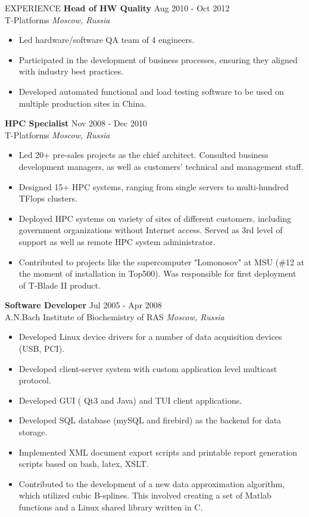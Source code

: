 \documentclass{resume} %
\begin{document}
\begin{rSection}{EXPERIENCE}
\textbf{Head of HW Quality} \hfill Aug 2010 - Oct 2012\\
T-Platforms \hfill \textit{Moscow, Russia}
\begin{itemize}
   \itemsep -3pt {}
   \item Led hardware/software QA team of 4 engineers.
   \item Participated in the development of business processes, ensuring they aligned with industry best practices.
   \item Developed automated functional and load testing software to be used on multiple production sites in China.
\end{itemize}

\textbf{HPC Specialist} \hfill Nov 2008 - Dec 2010\\
T-Platforms \hfill \textit{Moscow, Russia}
 \begin{itemize}
    \itemsep -3pt {}
    \item Led 20+ pre-sales projects as the chief architect. Consulted business development managers, as well as customers' technical and management staff.
    \item Designed 15+ HPC systems, ranging from single servers to multi-hundred TFlops clusters.
    \item Deployed HPC systems on variety of sites of different customers, including government organizations without Internet access. Served as 3rd level of support as well as remote HPC system administrator.
    \item Contributed to projects like the supercomputer "Lomonosov" at MSU (\#12 at the moment of installation in Top500). Was responsible for first deployment of T-Blade II product.
 \end{itemize}

\textbf{Software Developer} \hfill Jul 2005 - Apr 2008\\
A.N.Bach Institute of Biochemistry of RAS \hfill \textit{Moscow, Russia}
 \begin{itemize}
    \itemsep -3pt {}
    \item Developed Linux device drivers for a number of data acquisition devices (USB, PCI).
    \item Developed client-server system with custom application level multicast protocol.
    \item Developed GUI ( Qt3 and Java) and TUI client applications.
    \item Developed SQL database (mySQL and firebird) as the backend for data storage.
    \item Implemented XML document export scripts and printable report generation scripts based on bash, latex, XSLT.
    \item Contributed to the development of a new data approximation algorithm, which utilized cubic B-splines. This involved creating a set of Matlab functions and a Linux shared library written in C.
 \end{itemize}

\end{rSection}
\end{document}
